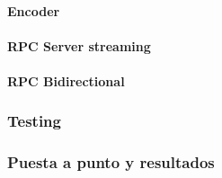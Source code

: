     \paragraph{Encoder}
        
    \paragraph{RPC Server streaming}
    \paragraph{RPC Bidirectional}
\subsubsection{Testing}
\subsubsection{Puesta a punto y resultados}